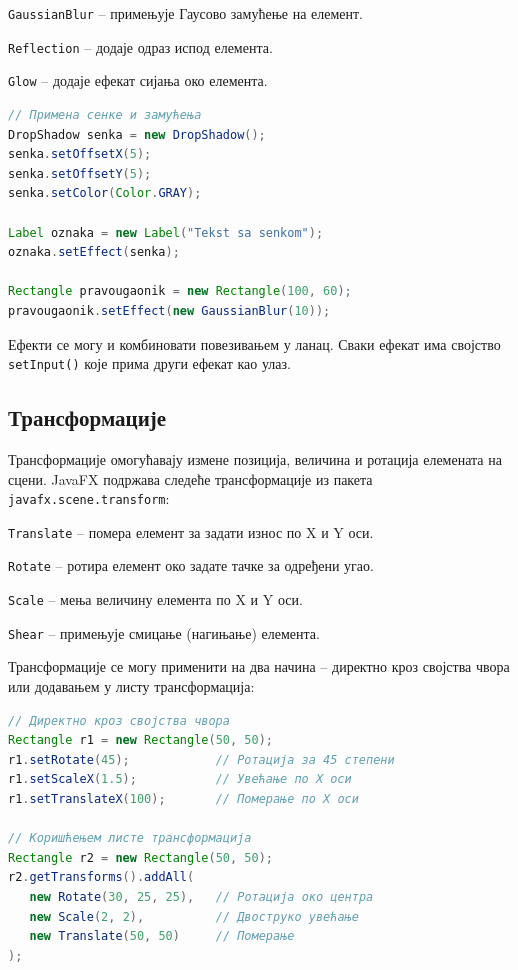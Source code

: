 \texttt{GaussianBlur} – примењује Гаусово замућење на елемент.

\texttt{Reflection} – додаје одраз испод елемента.

\texttt{Glow} – додаје ефекат сијања око елемента.


\begin{lstlisting}[language=Java]
// Примена сенке и замућења
DropShadow senka = new DropShadow();
senka.setOffsetX(5);
senka.setOffsetY(5);
senka.setColor(Color.GRAY);
 
Label oznaka = new Label("Tekst sa senkom");
oznaka.setEffect(senka);
 
Rectangle pravougaonik = new Rectangle(100, 60);
pravougaonik.setEffect(new GaussianBlur(10));
\end{lstlisting}


Ефекти се могу и комбиновати повезивањем у ланац. Сваки ефекат има својство \texttt{setInput()} које прима други ефекат као улаз.


\subsection{Трансформације}

Трансформације омогућавају измене позиција, величина и ротација елемената на сцени. JavaFX подржава следеће трансформације из пакета \texttt{javafx.scene.transform}:

\texttt{Translate} – помера елемент за задати износ по X и Y оси.

\texttt{Rotate} – ротира елемент око задате тачке за одређени угао.

\texttt{Scale} – мења величину елемента по X и Y оси.

\texttt{Shear} – примењује смицање (нагињање) елемента.

Трансформације се могу применити на два начина – директно кроз својства чвора или додавањем у листу трансформација:


\begin{lstlisting}[language=Java]
// Директно кроз својства чвора
Rectangle r1 = new Rectangle(50, 50);
r1.setRotate(45);            // Ротација за 45 степени
r1.setScaleX(1.5);           // Увећање по X оси
r1.setTranslateX(100);       // Померање по X оси
 
// Коришћењем листе трансформација
Rectangle r2 = new Rectangle(50, 50);
r2.getTransforms().addAll(
   new Rotate(30, 25, 25),   // Ротација око центра
   new Scale(2, 2),          // Двоструко увећање
   new Translate(50, 50)     // Померање
);
\end{lstlisting}


